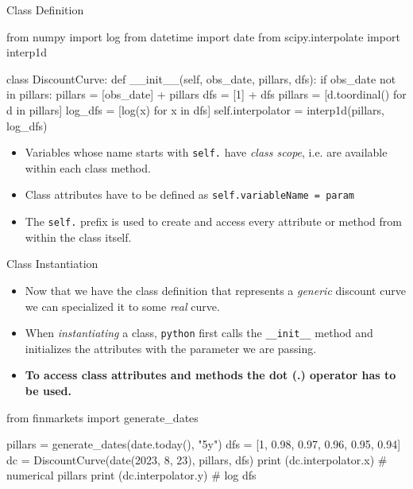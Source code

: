 \documentclass{beamer}
\begin{document}
\begin{frame}[fragile]{Class Definition}
\begin{ipython}
from numpy import log
from datetime import date
from scipy.interpolate import interp1d  
	
class DiscountCurve:
    def __init__(self, obs_date, pillars, dfs):
        if obs_date not in pillars:
            pillars = [obs_date] + pillars
            dfs = [1] + dfs
        pillars = [d.toordinal() for d in pillars]
        log_dfs = [log(x) for x in dfs]
        self.interpolator = interp1d(pillars, log_dfs)
\end{ipython}
\begin{itemize}
\item Variables whose name starts with \texttt{self.} have \emph{class scope}, i.e. are available within each class method.
\item Class attributes have to be defined as \texttt{self.variableName = param}
\item The \texttt{self.} prefix is used to create and access every attribute or method from within the class itself.
\end{itemize}
\end{frame}

\begin{frame}[fragile]{Class Instantiation}
  \begin{itemize}
  \item Now that we have the class definition that represents a \emph{generic} discount curve we can specialized it to some \emph{real} curve.
  \item When \emph{instantiating} a class, \texttt{python} first calls the \texttt{\_\_init\_\_} method and initializes the attributes with the parameter we are passing.
  \item \textbf{To access class attributes and methods the dot (.) operator has to be used.}
  \end{itemize}
\begin{ipython}
from finmarkets import generate_dates
			
pillars = generate_dates(date.today(), "5y")
dfs = [1, 0.98, 0.97, 0.96, 0.95, 0.94]      
dc = DiscountCurve(date(2023, 8, 23), pillars, dfs)
print (dc.interpolator.x) # numerical pillars
print (dc.interpolator.y) # log dfs
\end{ipython}
\begin{ioutput}
[738755 738761 739127 739492 739857 740222 740588]
[ 0.          0.         -0.02020271 -0.03045921 -0.04082199 -0.05129329
 -0.0618754 ]
\end{ioutput}
\end{frame}
\end{document}
